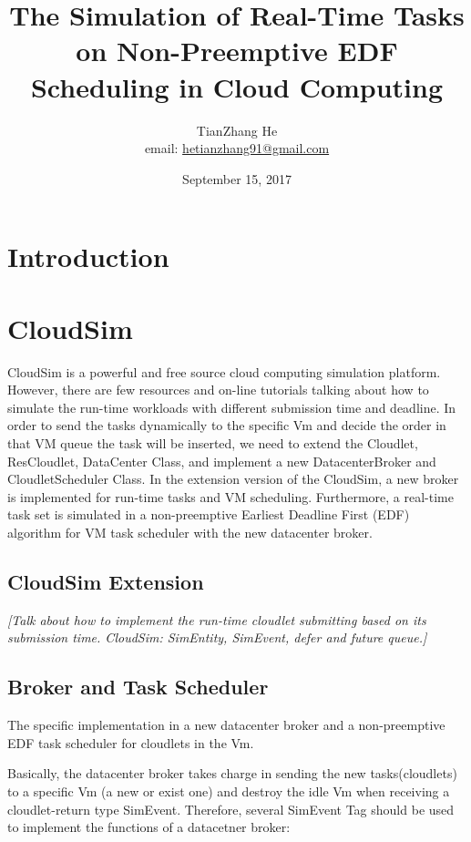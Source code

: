 \documentclass[twocolumn]{article}
\begin{document}
\onecolumn
\title{The Simulation of Real-Time Tasks on Non-Preemptive EDF Scheduling in Cloud Computing}
\author{TianZhang He\\ email: \href{mailto:hetianzhang91@gmail.com}{hetianzhang91@gmail.com}}
\date{September 15, 2017}
\maketitle

\section{Introduction}

\section{CloudSim}
CloudSim is a powerful and free source cloud computing simulation platform. However, there are few resources and on-line tutorials talking about how to simulate the run-time workloads with different submission time and deadline. In order to send the tasks dynamically to the specific Vm and decide the order in that VM queue the task will be inserted, we need to extend the Cloudlet, ResCloudlet, DataCenter Class, and implement a new DatacenterBroker and CloudletScheduler Class. In the extension version of the CloudSim, a new broker is implemented for run-time tasks and VM scheduling. Furthermore, a real-time task set is simulated in a non-preemptive Earliest Deadline First (EDF) algorithm for VM task scheduler with the new datacenter broker.

\subsection{CloudSim Extension}
\emph{[Talk about how to implement the run-time cloudlet submitting based on its submission time. CloudSim: SimEntity, SimEvent, defer and future queue.]}

\subsection{Broker and Task Scheduler}
The specific implementation in a new datacenter broker and a non-preemptive EDF task scheduler for cloudlets in the Vm.

Basically, the datacenter broker takes charge in sending the new tasks(cloudlets) to a specific Vm (a new or exist one) and destroy the idle Vm when receiving a cloudlet-return type SimEvent. Therefore, several SimEvent Tag should be used to implement the functions of a datacetner broker:
\end{document}
